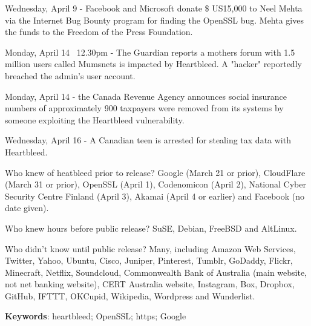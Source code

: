 Wednesday, April 9 - Facebook and Microsoft donate \$ US15,000 to Neel Mehta via the Internet Bug Bounty program for finding the OpenSSL bug. Mehta gives the funds to the Freedom of the Press Foundation.

Monday, April 14 ~12.30pm - The Guardian reports a mothers forum with 1.5 million users called Mumsnets is impacted by Heartbleed. A "hacker" reportedly breached the admin's user account.

Monday, April 14 - the Canada Revenue Agency announces social insurance numbers of approximately 900 taxpayers were removed from its systems by someone exploiting the Heartbleed vulnerability.

Wednesday, April 16 - A Canadian teen is arrested for stealing tax data with Heartbleed.

Who knew of heatbleed prior to release? Google (March 21 or prior), CloudFlare (March 31 or prior), OpenSSL (April 1), Codenomicon (April 2), National Cyber Security Centre Finland (April 3), Akamai (April 4 or earlier) and Facebook (no date given).

Who knew hours before public release? SuSE, Debian, FreeBSD and AltLinux.

Who didn't know until public release? Many, including Amazon Web Services, Twitter, Yahoo, Ubuntu, Cisco, Juniper, Pinterest, Tumblr, GoDaddy, Flickr, Minecraft, Netflix, Soundcloud, Commonwealth Bank of Australia (main website, not net banking website), CERT Australia website, Instagram, Box, Dropbox, GitHub, IFTTT, OKCupid, Wikipedia, Wordpress and Wunderlist.


\vspace{2em}
\noindent\textbf{Keywords}: heartbleed; OpenSSL; https; Google

